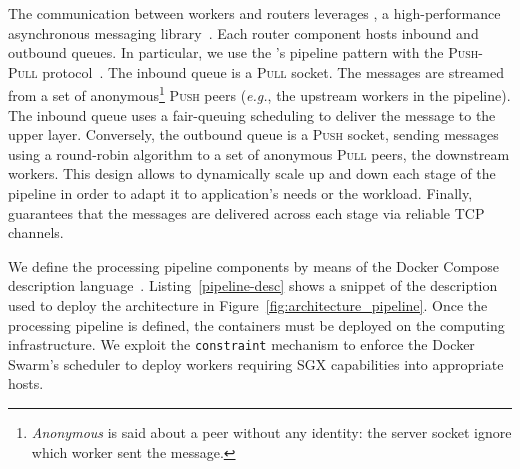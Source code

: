 The communication between workers and routers leverages \zmq, a high-performance asynchronous messaging library~\cite{zero_mq}.
Each router component hosts inbound and outbound queues. %
In particular, we use the \zmq's pipeline pattern with the \textsc{Push}-\textsc{Pull} protocol~\cite{zero_mq:pipeline}. 
The inbound queue is a \textsc{Pull} socket.
The messages are streamed from a set of anonymous\footnote{\emph{Anonymous} is said about a peer without any identity: the server socket ignore which worker sent the message.} \textsc{Push} peers (\emph{e.g.}, the upstream workers in the pipeline).
The inbound queue uses a fair-queuing scheduling to deliver the message to the upper layer.
Conversely, the outbound queue is a \textsc{Push} socket, sending messages using a round-robin algorithm to a set of anonymous \textsc{Pull} peers, the downstream workers.
This design allows to dynamically scale up and down each stage of the pipeline in order to adapt it to application's needs or the workload. %
Finally, \zmq guarantees that the messages are delivered across each stage via reliable TCP channels.

We define the processing pipeline components by means of the Docker Compose description language~\cite{docker:compose}.
Listing~\ref{pipeline-desc} shows a snippet of the description used to deploy the architecture in Figure~\ref{fig:architecture_pipeline}. 
Once the processing pipeline is defined, the containers must be deployed on the computing infrastructure.
We exploit the \texttt{constraint} mechanism to enforce the Docker Swarm's scheduler to deploy workers requiring SGX capabilities into appropriate hosts.

